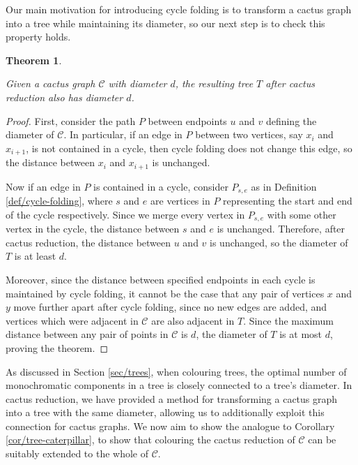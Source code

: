 \documentclass{mpaper}
\newtheorem{theorem}{Theorem}[section]
\begin{document}
Our main motivation for introducing cycle folding is to transform a cactus graph into a tree while maintaining its diameter, so our next step is to check this property holds.

\begin{theorem}
  \label{thm/cactus-reduction-diameter}

  Given a cactus graph $\mathcal{C}$ with diameter $d$, the resulting tree $T$ after cactus reduction also has diameter $d$.
\end{theorem}

\begin{proof}
  
First, consider the path $P$ between endpoints $u$ and $v$ defining the diameter of $\mathcal{C}$. In particular, if an edge in $P$ between two vertices, say $x_i$ and $x_{i+1}$, is not contained in a cycle, then cycle folding does not change this edge, so the distance between $x_i$ and $x_{i+1}$ is unchanged.

Now if an edge in $P$ is contained in a cycle, consider $P_{s,e}$ as in Definition \ref{def/cycle-folding}, where $s$ and $e$ are vertices in $P$ representing the start and end of the cycle respectively. Since we merge every vertex in $P_{s,e}$ with some other vertex in the cycle, the distance between $s$ and $e$ is unchanged. Therefore, after cactus reduction, the distance between $u$ and $v$ is unchanged, so the diameter of $T$ is at least $d$.

Moreover, since the distance between specified endpoints in each cycle is maintained by cycle folding, it cannot be the case that any pair of vertices $x$ and $y$ move further apart after cycle folding, since no new edges are added, and vertices which were adjacent in $\mathcal{C}$ are also adjacent in $T$. Since the maximum distance between any pair of points in $\mathcal{C}$ is $d$, the diameter of $T$ is at most $d$, proving the theorem.
\end{proof}

As discussed in Section \ref{sec/trees}, when colouring trees, the optimal number of monochromatic components in a tree is closely connected to a tree's diameter. In cactus reduction, we have provided a method for transforming a cactus graph into a tree with the same diameter, allowing us to additionally exploit this connection for cactus graphs. We now aim to show the analogue to Corollary \ref{cor/tree-caterpillar}, to show that colouring the cactus reduction of $\mathcal{C}$ can be suitably extended to the whole of $\mathcal{C}$.
\end{document}
